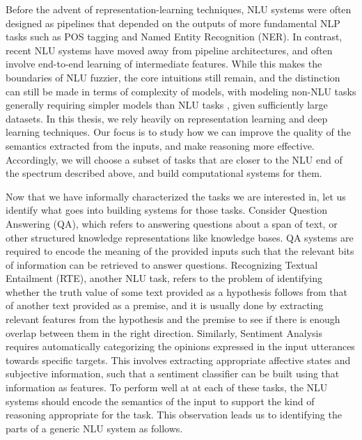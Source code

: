 Before the advent of representation-learning techniques, NLU systems were often designed as
pipelines that depended on the outputs of more fundamental NLP tasks such as POS tagging and Named
Entity Recognition (NER). In contrast, recent NLU systems have moved away from pipeline
architectures, and often involve end-to-end learning of intermediate features.  While this makes the
boundaries of NLU fuzzier, the core intuitions still remain, and the distinction can still be made
in terms of complexity of models, with modeling non-NLU tasks generally requiring simpler models
\citep{wang2015part} than NLU tasks \citep{chen2017enhanced}, given sufficiently large datasets.
In this thesis, we rely heavily on representation learning and deep learning techniques. Our focus
is to study how we can improve the quality of the semantics extracted from the inputs, and make
reasoning more effective.  Accordingly, we will choose a subset of tasks that are closer to the NLU
end of the spectrum described above, and build computational systems for them.

Now that we have informally characterized the tasks we are interested in,
let us identify what goes into building systems for those tasks.  Consider Question Answering (QA),
which refers to answering questions about a span of text, or other structured knowledge
representations like knowledge bases.  QA systems are required to encode the meaning
of the provided inputs such that the relevant bits of information can be retrieved to answer
questions.  Recognizing Textual Entailment (RTE), another NLU task, refers to the problem of
identifying whether the truth value of some text provided as a hypothesis follows from that of
another text provided as a premise, and it is usually done by extracting relevant features from the
hypothesis and the premise to see if there is enough overlap between them in the right direction.
Similarly, Sentiment Analysis requires automatically categorizing the opinions expressed in the
input utterances towards specific targets. This involves extracting appropriate affective states and
subjective information, such that a sentiment classifier can be built using that information as
features. To perform well at at each of these tasks, the NLU systems should encode the semantics of
the input to support the kind of reasoning appropriate for the task. This observation leads us to identifying the
parts of a generic NLU system as follows.

